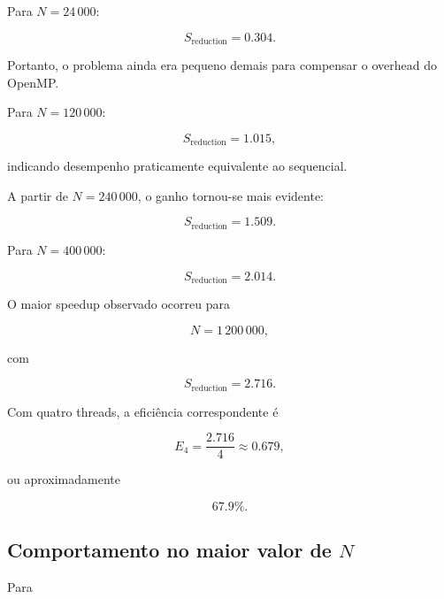 Para \(N=24\,000\):

\begin{equation}
    S_{\text{reduction}}
    =
    0.304.
\end{equation}

Portanto, o problema ainda era pequeno demais para compensar o overhead do
OpenMP.

Para \(N=120\,000\):

\begin{equation}
    S_{\text{reduction}}
    =
    1.015,
\end{equation}

indicando desempenho praticamente equivalente ao sequencial.

A partir de \(N=240\,000\), o ganho tornou-se mais evidente:

\begin{equation}
    S_{\text{reduction}}
    =
    1.509.
\end{equation}

Para \(N=400\,000\):

\begin{equation}
    S_{\text{reduction}}
    =
    2.014.
\end{equation}

O maior speedup observado ocorreu para

\begin{equation}
    N=1\,200\,000,
\end{equation}

com

\begin{equation}
    \boxed{
        S_{\text{reduction}}=2.716
    }.
\end{equation}

Com quatro threads, a eficiência correspondente é

\begin{equation}
    E_4
    =
    \frac{2.716}{4}
    \approx
    0.679,
\end{equation}

ou aproximadamente

\begin{equation}
    \boxed{67.9\%}.
\end{equation}


\subsection{Comportamento no maior valor de \(N\)}

Para

